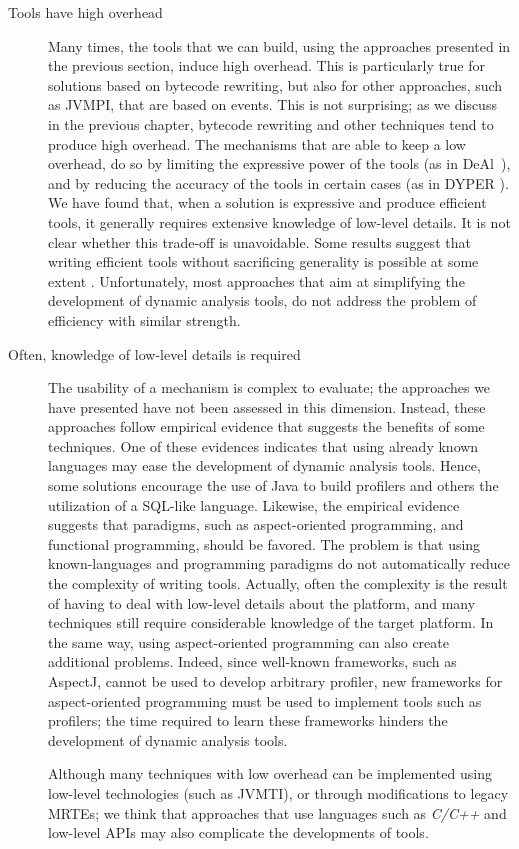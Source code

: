 \begin{description}
\item[Tools have high overhead]
Many times, the tools that we can build, using the approaches presented in the previous section, induce high overhead.
This is particularly true for solutions based on bytecode rewriting, but also for other approaches, such as JVMPI, that are based on events.
This is not surprising; as we discuss in the previous chapter, bytecode rewriting and other techniques tend to produce high overhead.
The mechanisms that are able to keep a low overhead, do so by limiting the expressive power of the tools (as in DeAl~\cite{Reichenbach:2010:GCE:1869459.1869482}), and by reducing the accuracy of the tools in certain cases (as in DYPER \cite{Reiss:2008:CDP:1383559.1383566}). 
We have found that, when a solution is expressive and produce efficient tools, it generally requires extensive knowledge of low-level details.
It is not clear whether this trade-off is unavoidable.
Some results suggest that writing efficient tools without sacrificing generality is possible at some extent \cite{Reiss:2008:CDP:1383559.1383566}.
Unfortunately, most approaches that aim at simplifying the development of dynamic analysis tools, do not address the problem of efficiency with similar strength.


\item[Often, knowledge of low-level details is required] 
The usability of a mechanism is complex to evaluate; the approaches we have presented have not been assessed in this dimension.
Instead, these approaches follow empirical evidence that suggests the benefits of some techniques.
One of these evidences indicates that using already known languages may ease the development of dynamic analysis tools.
Hence, some solutions encourage the use of Java to build profilers and others the utilization of a SQL-like language.
Likewise, the empirical evidence suggests that paradigms, such as aspect-oriented programming, and functional programming, should be favored.
The problem is that using known-languages and programming paradigms do not automatically reduce the complexity of writing tools.
Actually, often the complexity is the result of having to deal with low-level details about the platform,
and many techniques still require considerable knowledge of the target platform.
In the same way, using aspect-oriented programming can also create additional problems.
Indeed, since well-known frameworks, such as AspectJ, cannot be used to develop arbitrary profiler, new frameworks for aspect-oriented programming must be used to implement tools such as profilers; the time required to learn these frameworks hinders the development of dynamic analysis tools.

Although many techniques with low overhead can be implemented using low-level technologies (such as JVMTI), or through modifications to legacy MRTEs; 
we think that approaches that use languages such as \textit{C/C++} and low-level APIs may also complicate the developments of tools.
 
\end{description}

